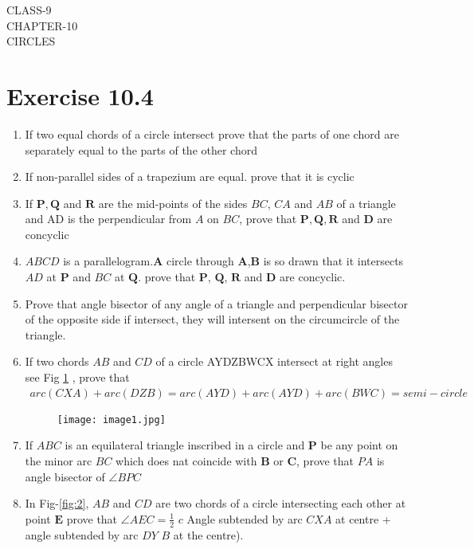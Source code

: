 \documentclass[12pt]{article}
\providecommand{\brak}[1]{\ensuremath{\left(#1\right)}}
\let\vec\mathbf
\begin{document}
\begin{center}
\textbf\large{CLASS-9\\CHAPTER-10 \\ CIRCLES}
\end{center}
\section*{Exercise 10.4}
\begin{enumerate}
\item If two equal chords of a circle intersect prove that the parts of one chord are separately equal to the parts of the other chord
\item If non-parallel sides of a trapezium are equal. prove that it is cyclic
\item If $\vec{P},\vec{Q}$ and $\vec{R}$ are the mid-points of the sides $BC$, $CA$ and $AB$ of a triangle and AD is the perpendicular from $A$ on $BC$, prove that $\vec{P},\vec{Q},\vec{R}$ and $\vec{D}$ are concyclic
\item $ABCD$ is a parallelogram.$\vec{A}$ circle through $\vec{A}$,$\vec{B}$ is so drawn that it intersects $AD$ at $\vec{P}$ and $BC$ at $\vec{Q}$. prove that $\vec{P}$, $\vec{Q}$, $\vec{R}$ and $\vec{D}$ are concyclic.
\item Prove that angle bisector of any angle of a triangle and perpendicular bisector of the opposite side if intersect, they will intersent on the circumcircle of the triangle.
\item If two chords $AB$ and $CD$ of a circle AYDZBWCX intersect at right angles see Fig \ref{fig:1} , prove that
	\begin{align}
		arc\brak{CXA}+arc\brak{DZB}=arc\brak{AYD}+arc\brak{AYD}+arc\brak{BWC}= semi-circle
	\end{align}
	\begin{figure}[h!]                        \begin{center}                                   \texttt{[image: image1.jpg]}                          \end{center}                            \caption{}                                       \label{fig:1}                    \end{figure}
	\item If $ABC$ is an equilateral triangle inscribed in a circle and $\vec{P}$ be any point on the minor arc $BC$ which does nat coincide with $\vec{B}$ or $\vec{C}$, prove that $PA$ is angle bisector of $\angle BPC$
	\item In Fig-\ref{fig:2}, $AB$ and $CD$ are two chords of a circle intersecting each other at point $\vec{E}$ prove that $\angle AEC=\frac{1}{2}$ $c$ Angle subtended by arc $CXA$ at centre + angle subtended by arc $DY$ $B$ at the centre).

\end{enumerate}
\end{document}
